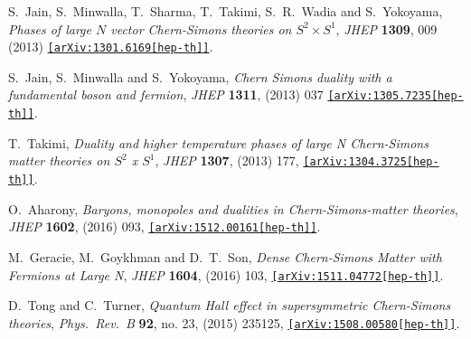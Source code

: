 \begin{thebibliography}{99}
  S.~Jain, S.~Minwalla, T.~Sharma, T.~Takimi, S.~R.~Wadia and S.~Yokoyama,
 {\it Phases of large $N$ vector Chern-Simons theories on $S^2 \times S^1$},
  {\it JHEP} {\bf 1309}, 009 (2013)
  \href{https://arxiv.org/abs/1301.6169}{\tt[arXiv:1301.6169[hep-th]]}.
  
  S.~Jain, S.~Minwalla and S.~Yokoyama,
  {\it Chern Simons duality with a fundamental boson and fermion},
  {\it JHEP} {\bf 1311}, (2013) 037 
   \href{https://arxiv.org/abs/1305.7235}{\tt[arXiv:1305.7235[hep-th]]}.

  
  T.~Takimi,
 {\it Duality and higher temperature phases of large N Chern-Simons matter theories on $S^2$ x $S^1$},
{\it JHEP} {\bf 1307}, (2013) 177,  
  \href{https://arxiv.org/abs/1304.3725}{\tt[arXiv:1304.3725[hep-th]]}.

  O.~Aharony,
  {\it Baryons, monopoles and dualities in Chern-Simons-matter theories}, 
  {\it JHEP} {\bf 1602},  (2016) 093, 
  \href{https://arxiv.org/abs/1512.00161}{\tt[arXiv:1512.00161[hep-th]]}.

  M.~Geracie, M.~Goykhman and D.~T.~Son,
  {\it Dense Chern-Simons Matter with Fermions at Large N},
  {\it JHEP} {\bf 1604}, (2016) 103, 
  \href{https://arxiv.org/abs/1511.04772}{\tt[arXiv:1511.04772[hep-th]]}.




  D.~Tong and C.~Turner,
  {\it Quantum Hall effect in supersymmetric Chern-Simons theories},
  {\it Phys.\ Rev.\ B} {\bf 92}, no. 23,  (2015) 235125,
  \href{https://arxiv.org/abs/1508.00580}{\tt[arXiv:1508.00580[hep-th]]}.



\end{thebibliography}
